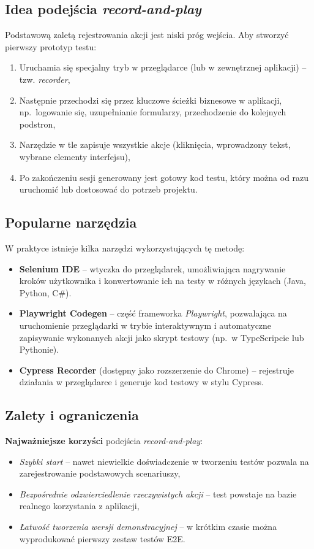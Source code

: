 \documentclass[12pt]{report}
\begin{document}
\subsection*{Idea podejścia \emph{record-and-play}}
Podstawową zaletą rejestrowania akcji jest niski próg wejścia. Aby stworzyć pierwszy prototyp testu:
\begin{enumerate}
    \item Uruchamia się specjalny tryb w przeglądarce (lub w zewnętrznej aplikacji) – tzw. \emph{recorder},
    \item Następnie przechodzi się przez kluczowe ścieżki biznesowe w aplikacji, np.\ logowanie się, uzupełnianie formularzy, przechodzenie do kolejnych podstron,
    \item Narzędzie w tle zapisuje wszystkie akcje (kliknięcia, wprowadzony tekst, wybrane elementy interfejsu),
    \item Po zakończeniu sesji generowany jest gotowy kod testu, który można od razu uruchomić lub dostosować do potrzeb projektu.
\end{enumerate}

\subsection*{Popularne narzędzia}
W praktyce istnieje kilka narzędzi wykorzystujących tę metodę:
\begin{itemize}
    \item \textbf{Selenium IDE} -- wtyczka do przeglądarek, umożliwiająca nagrywanie kroków użytkownika i konwertowanie ich na testy w różnych językach (Java, Python, C\#).
    \item \textbf{Playwright Codegen} -- część frameworka \emph{Playwright}, pozwalająca na uruchomienie przeglądarki w trybie interaktywnym i automatyczne zapisywanie wykonanych akcji jako skrypt testowy (np.\ w TypeScripcie lub Pythonie).
    \item \textbf{Cypress Recorder} (dostępny jako rozszerzenie do Chrome) -- rejestruje działania w przeglądarce i generuje kod testowy w stylu Cypress.
\end{itemize}

\subsection*{Zalety i ograniczenia}
\noindent\textbf{Najważniejsze korzyści} podejścia \emph{record-and-play}:
\begin{itemize}
    \item \emph{Szybki start} -- nawet niewielkie doświadczenie w tworzeniu testów pozwala na zarejestrowanie podstawowych scenariuszy,
    \item \emph{Bezpośrednie odzwierciedlenie rzeczywistych akcji} -- test powstaje na bazie realnego korzystania z aplikacji,
    \item \emph{Łatwość tworzenia wersji demonstracyjnej} -- w krótkim czasie można wyprodukować pierwszy zestaw testów E2E.
\end{itemize}
\end{document}
